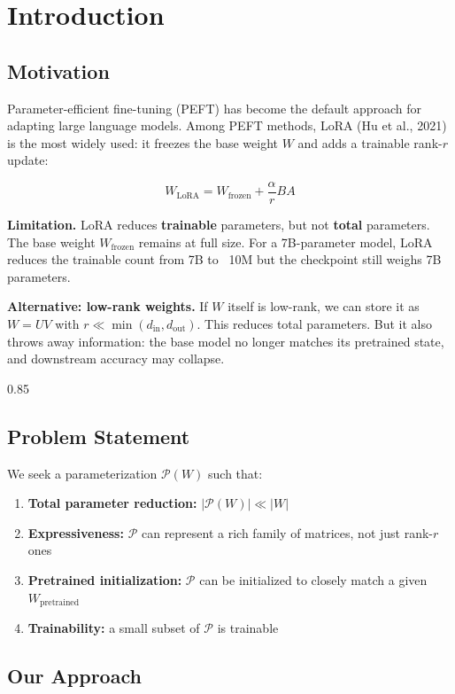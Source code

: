 
\section{Introduction}

\subsection{Motivation}

Parameter-efficient fine-tuning (PEFT) has become the default approach for 
adapting large language models. Among PEFT methods, LoRA (Hu et al., 2021) 
is the most widely used: it freezes the base weight $W$ and adds a trainable 
rank-$r$ update:

\[
W_\text{LoRA} = W_\text{frozen} + \frac{\alpha}{r} B A
\tag{1.1}
\]

\textbf{Limitation.} LoRA reduces \textbf{trainable} parameters, but not \textbf{total} 
parameters. The base weight $W_\text{frozen}$ remains at full size. For a 
7B-parameter model, LoRA reduces the trainable count from 7B to ~10M but 
the checkpoint still weighs 7B parameters.

\textbf{Alternative: low-rank weights.} If $W$ itself is low-rank, we can store 
it as $W = U V$ with $r \ll \min(d_\text{in}, d_\text{out})$. This reduces 
total parameters. But it also throws away information: the base model no 
longer matches its pretrained state, and downstream accuracy may collapse.

0.85


\subsection{Problem Statement}

We seek a parameterization $\mathcal{P}(W)$ such that:

\begin{enumerate}
\item \textbf{Total parameter reduction:} $|\mathcal{P}(W)| \ll |W|$
\item \textbf{Expressiveness:} $\mathcal{P}$ can represent a rich family of matrices,
  not just rank-$r$ ones
\item \textbf{Pretrained initialization:} $\mathcal{P}$ can be initialized to closely
  match a given $W_\text{pretrained}$
\item \textbf{Trainability:} a small subset of $\mathcal{P}$ is trainable

\end{enumerate}
\subsection{Our Approach}

